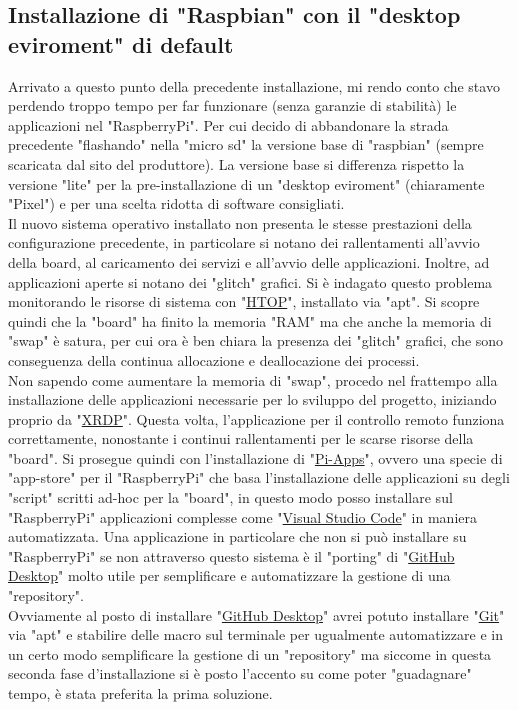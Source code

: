 \subsection{Installazione di "Raspbian" con il "desktop eviroment" di default}
Arrivato a questo punto della precedente installazione, mi rendo conto che stavo perdendo troppo tempo per far funzionare (senza garanzie di stabilità) le applicazioni nel "RaspberryPi". Per cui decido di abbandonare la strada precedente "flashando" nella "micro sd" la versione base di "raspbian" (sempre scaricata dal sito del produttore). La versione base si differenza rispetto la versione "lite" per la pre-installazione di un "desktop eviroment" (chiaramente "Pixel") e per una scelta ridotta di software consigliati.\\
Il nuovo sistema operativo installato non presenta le stesse prestazioni della configurazione precedente, in particolare si notano dei rallentamenti all'avvio della board, al caricamento dei servizi e all'avvio delle applicazioni. Inoltre, ad applicazioni aperte si notano dei "glitch" grafici. Si è indagato questo problema monitorando le risorse di sistema con "\href{https://htop.dev/}{HTOP}", installato via "apt". Si scopre quindi che la "board" ha finito la memoria "RAM" ma che anche la memoria di "swap" è satura, per cui ora è ben chiara la presenza dei "glitch" grafici, che sono conseguenza della continua allocazione e deallocazione dei processi.\\
Non sapendo come aumentare la memoria di "swap", procedo nel frattempo alla installazione delle applicazioni necessarie per lo sviluppo del progetto, iniziando proprio da "\href{https://github.com/neutrinolabs/xrdp}{XRDP}". Questa volta, l'applicazione per il controllo remoto funziona correttamente, nonostante i continui rallentamenti per le scarse risorse della "board". Si prosegue quindi con l'installazione di "\href{https://pi-apps.io/}{Pi-Apps}", ovvero una specie di "app-store" per il "RaspberryPi" che basa l'installazione delle applicazioni su degli "script" scritti ad-hoc per la "board", in questo modo posso installare sul "RaspberryPi" applicazioni complesse come "\href{https://code.visualstudio.com/}{Visual Studio Code}" in maniera automatizzata. Una applicazione in particolare che non si può installare su "RaspberryPi" se non attraverso questo sistema è il "porting" di "\href{https://desktop.github.com/}{GitHub Desktop}" molto utile per semplificare e automatizzare la gestione di una "repository".\\
Ovviamente al posto di installare "\href{https://desktop.github.com/}{GitHub Desktop}" avrei potuto installare "\href{https://git-scm.com/}{Git}" via "apt" e stabilire delle macro sul terminale per ugualmente automatizzare e in un certo modo semplificare la gestione di un "repository" ma siccome in questa seconda fase d'installazione si è posto l'accento su come poter "guadagnare" tempo, è stata preferita la prima soluzione.\\
